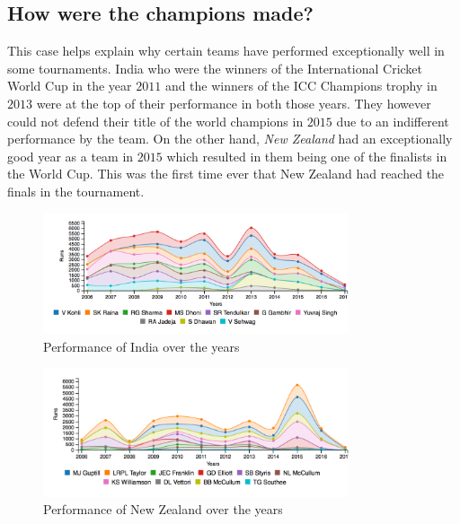 \documentclass[10pt,journal,compsoc]{IEEEtran}
\begin{document}
\subsection{How were the champions made?}
This case helps explain why certain teams have performed exceptionally well in some tournaments. India who were the winners of the International Cricket World Cup in the year $2011$ and the winners of the ICC Champions trophy in $2013$ were at the top of their performance in both those years. They however could not defend their title of the world champions in $2015$ due to an indifferent performance by the team. On the other hand, \textit{New Zealand} had an exceptionally good year as a team in $2015$ which resulted in them being one of the finalists in the World Cup. This was the first time ever that New Zealand had reached the finals in the tournament.
\begin{figure}[ht]
\includegraphics[width=9cm]{india_case3.png}
\caption{Performance of India over the years}
\label{fig:india_case3}
\end{figure}

\begin{figure}[ht]
\includegraphics[width=9cm]{newzealand_case3.png}
\caption{Performance of New Zealand over the years}
\label{fig:newzealand_case3}
\end{figure}
\end{document}
